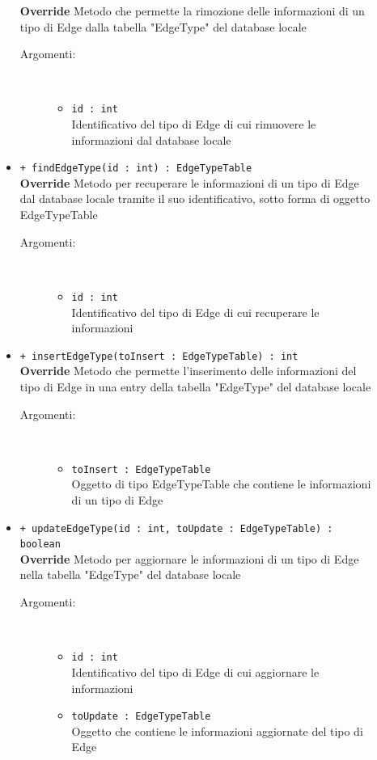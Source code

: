 \documentclass[../DefinizioneDiProdotto.tex]{subfiles}
\begin{document}
\begin{description}
\begin{itemize}
		\textbf{Override} Metodo che permette la rimozione delle informazioni di un tipo di Edge dalla tabella "EdgeType" del database locale
		\begin{description}
			\item[Argomenti:] \
			\begin{itemize}
				\item \texttt{id : int}\\
				Identificativo del tipo di Edge di cui rimuovere le informazioni dal database locale\end{itemize}
		\end{description}
		\item \texttt{+ findEdgeType(id : int) : EdgeTypeTable}\\
		\textbf{Override} Metodo per recuperare le informazioni di un tipo di Edge dal database locale tramite il suo identificativo, sotto forma di oggetto EdgeTypeTable
		\begin{description}
			\item[Argomenti:] \
			\begin{itemize}
				\item \texttt{id : int}\\
				Identificativo del tipo di Edge di cui recuperare le informazioni\end{itemize}
		\end{description}
		\item \texttt{+ insertEdgeType(toInsert : EdgeTypeTable) : int}\\
		\textbf{Override} Metodo che permette l'inserimento delle informazioni del tipo di Edge in una entry della tabella "EdgeType" del database locale
		\begin{description}
			\item[Argomenti:] \
			\begin{itemize}
				\item \texttt{toInsert : EdgeTypeTable}\\
				Oggetto di tipo EdgeTypeTable che contiene le informazioni di un tipo di Edge\end{itemize}
		\end{description}
		\item \texttt{+ updateEdgeType(id : int, toUpdate : EdgeTypeTable) : boolean}\\
		\textbf{Override} Metodo per aggiornare le informazioni di un tipo di Edge nella tabella "EdgeType" del database locale
		\begin{description}
			\item[Argomenti:] \
			\begin{itemize}
				\item \texttt{id : int}\\
				Identificativo del tipo di Edge di cui aggiornare le informazioni\item \texttt{toUpdate : EdgeTypeTable}\\
				Oggetto che contiene le informazioni aggiornate del tipo di Edge\end{itemize}
		\end{description}
	\end{itemize}
\end{description}
\end{document}
